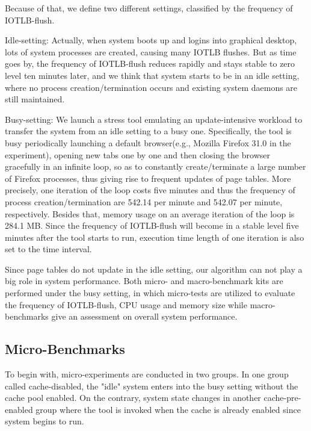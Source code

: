 Because of that, we define two different settings, classified by the frequency of IOTLB-flush.

Idle-setting: Actually, when system boots up and logins into graphical desktop, lots of system processes are created, causing many IOTLB flushes. But as time goes by, the frequency of IOTLB-flush reduces rapidly and stays stable to zero level ten minutes later, and we think that system starts to be in an idle setting, where no process creation/termination occurs and existing system daemons are still maintained.

Busy-setting: We launch a stress tool emulating an update-intensive workload to transfer the system from an idle setting to a busy one. Specifically, the tool is busy periodically launching a default browser(e.g., Mozilla Firefox 31.0 in the experiment), opening new tabs one by one and then closing the browser gracefully in an infinite loop, so as to constantly create/terminate a large number of Firefox processes, thus giving rise to frequent updates of page tables. More precisely, one iteration of the loop costs five minutes and thus the frequency of process creation/termination are 542.14 per minute and 542.07 per minute, respectively. Besides that, memory usage on an average iteration of the loop is 284.1 MB. Since the frequency of IOTLB-flush will become in a stable level five minutes after the tool starts to run, execution time length of one iteration is also set to the time interval.

Since page tables do not update in the idle setting, our algorithm can not play a big role in system performance. Both micro- and macro-benchmark kits are performed under the busy setting, in which micro-tests are utilized to evaluate the frequency of IOTLB-flush, CPU usage and memory size while macro-benchmarks give an assessment on overall system performance.

\subsection{Micro-Benchmarks}

To begin with, micro-experiments are conducted in two groups. In one group called cache-disabled, the "idle" system enters into the busy setting without the cache pool enabled. On the contrary, system state changes in another cache-pre-enabled group where the tool is invoked when the cache is already enabled since system begins to run.

